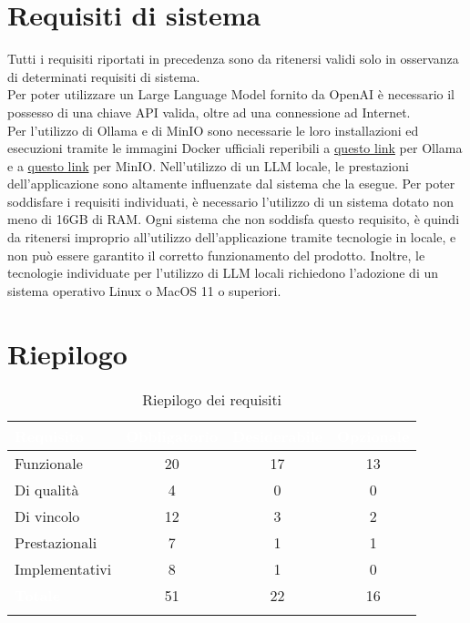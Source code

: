 \section{Requisiti di sistema}
Tutti i requisiti riportati in precedenza sono da ritenersi validi solo in osservanza di determinati requisiti di sistema.\\
Per poter utilizzare un Large Language Model fornito da OpenAI è necessario il possesso di una chiave API valida, oltre ad una connessione ad Internet.\\
Per l'utilizzo di Ollama e di MinIO sono necessarie le loro installazioni ed esecuzioni tramite le immagini Docker ufficiali reperibili a \href{https://ollama.ai/blog/ollama-is-now-available-as-an-official-docker-image}{questo link} per Ollama e a \href{https://min.io/docs/minio/container/index.html}{questo link} per MinIO.
Nell'utilizzo di un LLM locale, le prestazioni dell'applicazione sono altamente influenzate dal sistema che la esegue. Per poter soddisfare i requisiti individuati, è necessario l'utilizzo di un sistema dotato non meno di 16GB di RAM. Ogni sistema che non soddisfa questo requisito, è quindi da ritenersi improprio all'utilizzo dell'applicazione tramite tecnologie in locale, e non può essere garantito il corretto funzionamento del prodotto. Inoltre, le tecnologie individuate per l'utilizzo di LLM locali richiedono l'adozione di un sistema operativo Linux o MacOS 11 o superiori.
\newpage
\section{Riepilogo}
\begingroup
\setlength{\tabcolsep}{10pt}
\renewcommand{\arraystretch}{1.5}
\begin{xltabular}{\textwidth}{| X | c | c | c |}
    \hline
     \textbf{\textcolor{white}{Requisito}} & \textbf{\textcolor{white}{Obbligatorio}} & \textbf{\textcolor{white}{Desiderabile}} & \textbf{\textcolor{white}{Opzionale}}\\
    \hline
    \endhead
    Funzionale & 20 & 17 & 13 \\
    \hline
    Di qualità & 4 & 0 & 0 \\
    \hline
    Di vincolo & 12 & 3 & 2 \\
    \hline
    Prestazionali & 7 & 1 & 1 \\
    \hline
    Implementativi & 8 & 1 & 0 \\
    \hline
     \textbf{\textcolor{white}{Totale}} & 51 & 22 & 16 \\
    \hline
     \caption{Riepilogo dei requisiti}
    \label{tab:riepilogo}
\end{xltabular}
\endgroup

